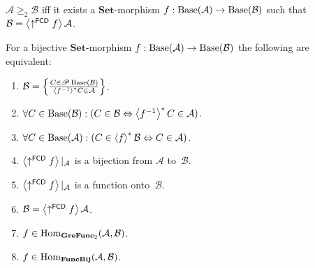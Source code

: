 \begin{cor}
$\mathcal{A}\ge_{2}\mathcal{B}$ iff it exists a $\mathbf{Set}$-morphism
$f:\operatorname{Base}(\mathcal{A})\rightarrow\operatorname{Base}(\mathcal{B})$ such that $\mathcal{B}=\left\langle \uparrow^{\mathsf{FCD}}f\right\rangle\mathcal{A}$.\end{cor}
\begin{prop}
For a bijective $\mathbf{Set}$-morphism $f:\operatorname{Base}(\mathcal{A})\rightarrow\operatorname{Base}(\mathcal{B})$
the following are equivalent:
\begin{enumerate}
\item \label{fbij-star}$\mathcal{B}=\left\{ \frac{C\in\mathscr{P}\operatorname{Base}(\mathcal{B})}{\left\langle f^{-1}\right\rangle ^{\ast}C\in\mathcal{A}}\right\}$.
\item \label{fbij-eback}$\forall C\in\operatorname{Base}(\mathcal{B}):(C\in\mathcal{B}\Leftrightarrow\left\langle f^{-1}\right\rangle ^{\ast}C\in\mathcal{A})$.
\item \label{fbij-eforw}$\forall C\in\operatorname{Base}(\mathcal{A}):(C\in\left\langle f\right\rangle ^{\ast}\mathcal{B}\Leftrightarrow C\in\mathcal{A})$.
\item \label{fbij-rbij}$\left\langle \uparrow^{\mathsf{FCD}}f\right\rangle|_{\mathcal{A}}$
is a bijection from $\mathcal{A}$ to~$\mathcal{B}$.
\item \label{fbij-rsurj}$\left\langle \uparrow^{\mathsf{FCD}}f\right\rangle|_{\mathcal{A}}$
is a function onto~$\mathcal{B}$.
\item \label{fbij-feq}$\mathcal{B}=\left\langle \uparrow^{\mathsf{FCD}}f\right\rangle\mathcal{A}$.
\item \label{fbij-gre}$f\in\operatorname{Hom}_{\mathbf{GreFunc}_{2}}(\mathcal{A},\mathcal{B})$.
\item \label{fbij-grp}$f\in\operatorname{Hom}_{\mathbf{FuncBij}}(\mathcal{A},\mathcal{B})$.
\end{enumerate}
\end{prop}
